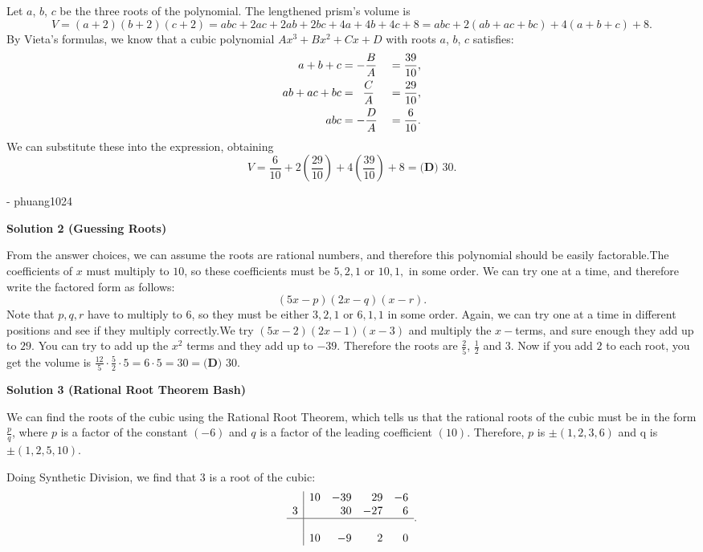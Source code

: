 \begin{enumerate}
Let $a$, $b$, $c$ be the three roots of the polynomial. The lengthened prism's volume is 
 \[V = (a+2)(b+2)(c+2) = abc + 2ac + 2ab + 2bc + 4a + 4b + 4c + 8 = abc + 2(ab+ac+bc) + 4(a+b+c) + 8.\]By Vieta's formulas, we know that a cubic polynomial $Ax^3+Bx^2+Cx+D$ with roots $a$, $b$, $c$ satisfies:
 \begin{alignat*}{8} a+b+c &= -\frac{B}{A} &&= \frac{39}{10}, \\ ab+ac+bc &= \hspace{2mm}\frac{C}{A} &&= \frac{29}{10}, \\ abc &= -\frac{D}{A} &&= \frac{6}{10}. \end{alignat*}We can substitute these into the expression, obtaining 
 \[V = \frac{6}{10} + 2\left(\frac{29}{10}\right) + 4\left(\frac{39}{10}\right) + 8 = \boxed{\textbf{(D) } 30}.\]

 - phuang1024

 



\textbf{Solution 2 (Guessing Roots)}

From the answer choices, we can assume the roots are rational numbers, and therefore this polynomial should be easily factorable.The coefficients of $x$ must multiply to $10$, so these coefficients must be $5,2,1$ or $10,1,$ in some order. We can try one at a time, and therefore write the factored form as follows: 
 \[(5x-p)(2x-q)(x-r).\]Note that $p, q, r$ have to multiply to $6$, so they must be either $3,2,1$ or $6,1,1$ in some order. Again, we can try one at a time in different positions and see if they multiply correctly.We try $(5x-2)(2x-1)(x-3)$ and multiply the $x-$terms, and sure enough they add up to $29$. You can try to add up the $x^2$ terms and they add up to $-39$. Therefore the roots are $\frac{2}{5}$, $\frac{1}{2}$ and $3$. Now if you add $2$ to each root, you get the volume is $\frac{12}{5} \cdot \frac{5}{2} \cdot 5 = 6 \cdot 5 = 30 = \boxed{\textbf{(D) } 30}$.

 



\textbf{Solution 3 (Rational Root Theorem Bash)}

We can find the roots of the cubic using the Rational Root Theorem, which tells us that the rational roots of the cubic must be in the form $\frac{p}{q}$, where $p$ is a factor of the constant $(-6)$ and $q$ is a factor of the leading coefficient $(10)$. Therefore, $p$ is $\pm (1, 2, 3, 6)$ and q is $\pm (1, 2, 5, 10).$

 Doing Synthetic Division, we find that $3$ is a root of the cubic:
 \[\begin{array}{c|rrrr}&10&-39&29&-6\\3&&30&-27&6\\\hline\\&10&-9&2&0\\\end{array}.\]


\end{enumerate}
